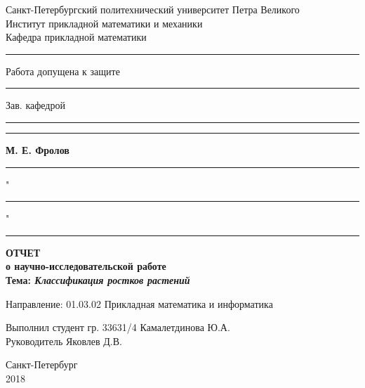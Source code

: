 \begin{titlepage}

\begin{center}
Санкт-Петербургский политехнический университет Петра Великого\\
Институт прикладной математики и механики\\
Кафедра прикладной математики\\
\hrulefill
\end{center}

\begin{flushleft}
\rule{8cm}{0pt} {Работа допущена к защите}\\
\rule{8cm}{0pt} Зав. кафедрой\\
\rule{8cm}{0pt} \rule{2.5cm}{0.5pt} {\bfseries{М. Е. Фролов }}\\
\rule{8cm}{0pt} "\rule{.9cm}{0.5pt}" \rule{4cm}{0.5pt}
\end{flushleft}

\vspace{2.5cm}

\begin{center}
{\large {\bfseries ОТЧЕТ\\
о научно-исследовательской работе}}\\

\bigskip \bfseries{Тема:} {\bfseries \emph{Классификация ростков растений}}
\end{center}

\vspace{1.5cm}

\begin{flushleft}
Направление: 01.03.02 Прикладная математика и информатика

\vspace{1.5cm}

Выполнил студент гр. 33631/4 \hfill{Камалетдинова Ю.А.} \\ 

\vspace{0.5cm} Руководитель \hfill{Яковлев Д.В.}
\vspace{1cm}

\end{flushleft}

\vspace{1.7cm}

\begin{center}
Санкт-Петербург\\
2018
\end{center}

\end{titlepage}
